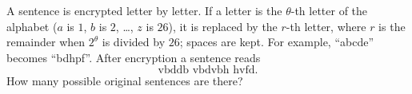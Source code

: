 A sentence is encrypted letter by letter. If a letter is the $\theta$-th letter of the alphabet ($a$ is $1$, $b$ is $2$, \dots, $z$ is $26$), it is replaced by the $r$-th letter, where $r$ is the remainder when $2^\theta$ is divided by $26$; spaces are kept. For example, ``abcde'' becomes ``bdhpf''. After encryption a sentence reads
\[\text{vbddb vbdvbh hvfd}.\]
How many possible original sentences are there?
